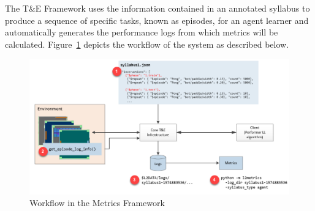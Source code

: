 The T\&E Framework uses the information contained in an annotated syllabus to produce a sequence of specific tasks, known as episodes, for an agent learner and automatically generates the performance logs from which metrics will be calculated. Figure~\ref{fig:workflow} depicts the workflow of the system as described below.\\[0.2in]

\begin{figure}[h]
	\centering
	\includegraphics[width=0.9\columnwidth]{sections/figs/metrics_overview_1.png}
	\caption{Workflow in the Metrics Framework}
	\label{fig:workflow}
\end{figure}

